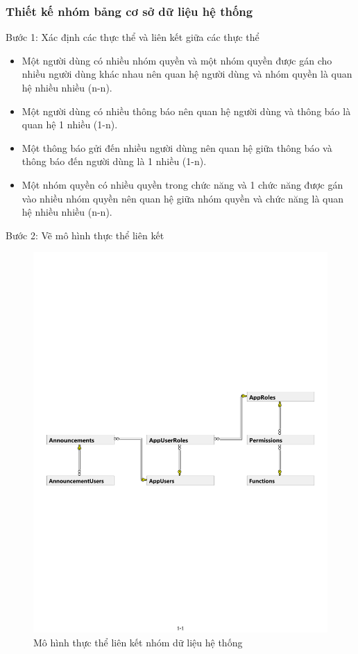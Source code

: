 \subsubsection{Thiết kế nhóm bảng cơ sở dữ liệu hệ thống}
Bước 1: Xác định các thực thể và liên kết giữa các thực thể 
\begin{itemize}
\item Một người dùng có nhiều nhóm quyền và một nhóm quyền được gán cho nhiều người dùng khác nhau nên quan hệ người dùng và nhóm quyền là quan hệ nhiều nhiều (n-n).
\item Một người dùng có nhiều thông báo nên quan hệ người dùng và thông báo là quan hệ 1 nhiều (1-n).
\item Một thông báo gửi đến nhiều người dùng nên quan hệ giữa thông báo và thông báo đến người dùng là 1 nhiều (1-n).
\item Một nhóm quyền có nhiều quyền trong chức năng và 1 chức năng được gán vào nhiều nhóm quyền nên quan hệ giữa nhóm quyền và chức năng là quan hệ nhiều nhiều (n-n).
\end{itemize}
Bước 2: Vẽ mô hình thực thể liên kết
\begin{center}
    \begin{figure}[h]
    \begin{center}
     \includegraphics[scale=0.65]{image/E-RSystem.pdf}
    \end{center}
    \caption{Mô hình thực thể liên kết nhóm dữ liệu hệ thống}
    \label{refhinh3_11}
    \end{figure}
\end{center}
